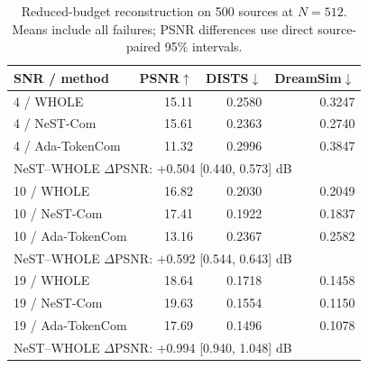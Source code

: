 \begin{table}[t]
\caption{Reduced-budget reconstruction on 500 sources at $N=512$. Means include all failures; PSNR differences use direct source-paired 95\% intervals.}
\label{tab:reduced}\centering\footnotesize\setlength{\tabcolsep}{3pt}
\begin{tabular}{@{}lrrr@{}}\toprule
SNR / method & PSNR$\uparrow$ & DISTS$\downarrow$ & DreamSim$\downarrow$\\
\midrule
4 / WHOLE & 15.11 & 0.2580 & 0.3247\\
4 / NeST-Com & 15.61 & 0.2363 & 0.2740\\
4 / Ada-TokenCom & 11.32 & 0.2996 & 0.3847\\
\multicolumn{4}{l}{NeST--WHOLE $\Delta$PSNR: +0.504 [0.440, 0.573] dB}\\
\midrule
10 / WHOLE & 16.82 & 0.2030 & 0.2049\\
10 / NeST-Com & 17.41 & 0.1922 & 0.1837\\
10 / Ada-TokenCom & 13.16 & 0.2367 & 0.2582\\
\multicolumn{4}{l}{NeST--WHOLE $\Delta$PSNR: +0.592 [0.544, 0.643] dB}\\
\midrule
19 / WHOLE & 18.64 & 0.1718 & 0.1458\\
19 / NeST-Com & 19.63 & 0.1554 & 0.1150\\
19 / Ada-TokenCom & 17.69 & 0.1496 & 0.1078\\
\multicolumn{4}{l}{NeST--WHOLE $\Delta$PSNR: +0.994 [0.940, 1.048] dB}\\
\bottomrule\end{tabular}\end{table}
